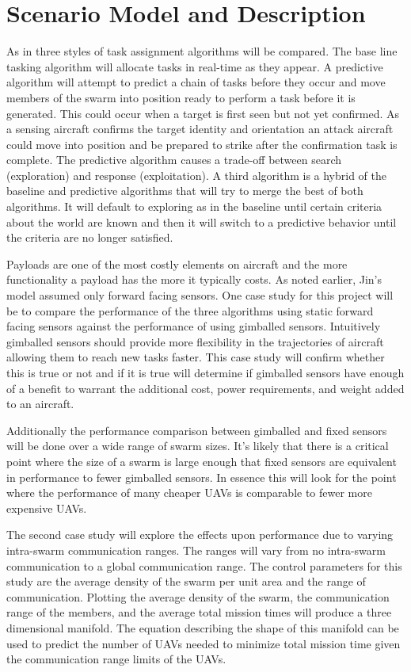 \chapter{Scenario Model and Description}

As in \cite{jin} three styles of task assignment algorithms will be compared.  The base line tasking algorithm will allocate tasks in real-time as they appear.   A predictive algorithm will attempt to predict a chain of tasks before they occur and move members of the swarm into position ready to perform a task before it is generated.  This could occur when a target is first seen but not yet confirmed.   As a sensing aircraft confirms the target identity and orientation an attack aircraft could move into position and be prepared to strike after the confirmation task is complete.  The predictive algorithm causes a trade-off between search (exploration) and response (exploitation).  A third algorithm is a hybrid of the baseline and predictive algorithms that will try to merge the best of both algorithms.  It will default to exploring as in the baseline until certain criteria about the world are known and then it will switch to a predictive behavior until the criteria are no longer satisfied.

Payloads are one of the most costly elements on aircraft and the more functionality a payload has the more it typically costs.  As noted earlier, Jin’s model assumed only forward facing sensors.  One case study for this project will be to compare the performance of the three algorithms using static forward facing sensors against the performance of using gimballed sensors.  Intuitively gimballed sensors should provide more flexibility in the trajectories of aircraft allowing them to reach new tasks faster.  This case study will confirm whether this is true or not and if it is true will determine if gimballed sensors have enough of a benefit to warrant the additional cost, power requirements, and weight added to an aircraft.  

Additionally the performance comparison between gimballed and fixed sensors will be done over a wide range of swarm sizes.  It’s likely that there is a critical point where the size of a swarm is large enough that fixed sensors are equivalent in performance to fewer gimballed sensors.  In essence this will look for the point where the performance of many cheaper UAVs is comparable to fewer more expensive UAVs.

The second case study will explore the effects upon performance due to varying intra-swarm communication ranges.  The ranges will vary from no intra-swarm communication to a global communication range.  The control parameters for this study are the average density of the swarm per unit area and the range of communication.  Plotting the average density of the swarm, the communication range of the members, and the average total mission times will produce a three dimensional manifold.  The equation describing the shape of this manifold can be used to predict the number of UAVs needed to minimize total mission time given the communication range limits of the UAVs.

